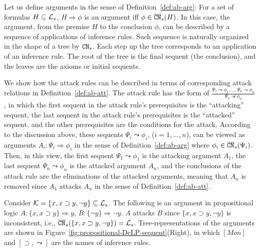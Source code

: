 \begin{itemize}
Let us define arguments in the sense of Definition~\ref{def:ab-arg}: For a set of formulas $H \subseteq \mathcal{L}_s$, $H \Rightarrow \phi$ is an argument iff $\phi \in \overline{\texttt{\textup{CN}}}_s(H)$. In this case, the argument, from the premise $H$ to the conclusion $\phi$, can be described by a sequence of applications of inference rules.
Such sequence is naturally organized in the shape of a tree by $\texttt{\textup{CN}}_s$.  Each step up the tree corresponds to an application of an inference rule. The root of the tree is the final sequent (the conclusion), and the leaves are the axioms or initial sequents.


We show how the attack rules can be described in terms of corresponding attack relations in Definition~\ref{def:ab-att}. The attack rule has the form of 
$\frac{\Psi_1 \leadsto \phi_1 , \ldots ,\Psi_n \leadsto \phi_n}{\Psi_n \not \leadsto \phi_n}$, in which
the first sequent in the attack rule’s prerequisites is the “attacking” sequent, the last sequent in the attack rule’s prerequisites is the “attacked” sequent, 
and the other prerequisites are the conditions for the attack. According to the discussion above, these sequents $\Psi_i \leadsto \phi_i$, ($i = 1, \ldots, n$), can be viewed as arguments $A_i : \Psi_i \Rightarrow \phi_i$ in the sense of Definition~\ref{def:ab-arg} where $\phi_i \in \overline{\texttt{\textup{CN}}}_s (\Psi_i)$. Then, in this view, the first sequent $\Psi_1 \leadsto \phi_1$ is the attacking argument $A_1$, the last sequent $\Psi_n \leadsto \phi_n$ is the attacked argument $A_n$, and the conclusions of the attack rule are the eliminations of the attacked arguments, meaning that $A_n$ is removed since $A_1$ attacks $A_n$ in the sense of Definition~\ref{def:ab-att}.


\begin{example}  Consider $\mathcal{K} = \{x, x \supset y, \neg y \} \subseteq \mathcal{L}_s$.
The following is an argument in propositional logic $A : \{x, x \supset y \} \Rightarrow  y$, $B : \{ \neg y \} \Rightarrow \neg y$. $A$ attacks $B$ since $\{ x, x \supset y, \neg y \}$ is inconsistent, i.e., $\overline{\texttt{\textup{CN}}}_s( \{ x, x \supset y, \neg y \}) = \mathcal{L}_s$. Tree-representations of the arguments are shown in Figure~\ref{fig:propositional-DeLP-sequent}(Right), in which $[Mon]$ and $[\supset,\leadsto]$ are the names of inference rules.
\end{example}


\end{itemize}
